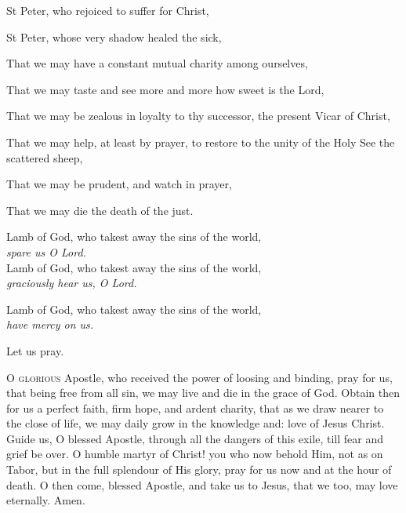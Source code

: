 \begin{hangparas}{1em}{1}
St Peter, who rejoiced to suffer for Christ,

St Peter, whose very shadow healed the sick,

That we may have a constant mutual charity among ourselves,

That we may taste and see more and more how sweet is the Lord,

That we may be zealous in loyalty to thy successor, the present Vicar of Christ, 

That we may help, at least by prayer, to restore to the unity of the Holy See the scattered sheep,                                     

That we may be prudent, and watch in prayer,

That we may die the death of the just.

\end{hangparas}

Lamb of God, who takest away the sins of the world,\\
	\textit{spare us O Lord.}\\
Lamb of God, who takest away the sins of the world,\\
	\textit{graciously hear us, O Lord.}

Lamb of God, who takest away the sins of the world,\\
	\textit{have mercy on us.}

{\centering Let us pray.\par}

\lettrine{O}{ glorious} Apostle, who received the power of loosing and binding,
pray for us, that being free from all sin, we may live and die in the
grace of God. Obtain then for us a perfect faith, firm hope, and
ardent charity, that as we draw nearer to the close of life, we may
daily grow in the knowledge and: love of Jesus Christ. Guide us, O
blessed Apostle, through all the dangers of this exile, till fear and
grief be over. O humble martyr of Christ! you who now behold Him, not
as on Tabor, but in the full  splendour of His glory, pray for us now
and at the hour of death. O then come, blessed Apostle, and take us to
Jesus, that we too, may love eternally.
\Rbar Amen.


